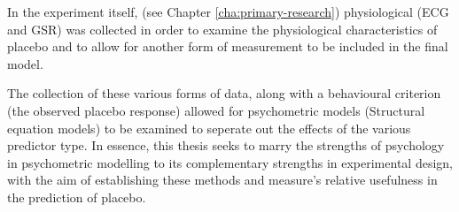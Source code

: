 In the experiment itself, (see Chapter \ref{cha:primary-research}) physiological (ECG and GSR) was collected in order to examine the physiological characteristics of placebo and to allow for another form of measurement to be included in the final model.

The collection of these various forms of data, along with a behavioural criterion (the observed placebo response) allowed for psychometric models (Structural equation models) to be examined to seperate out the effects of the various predictor type. In essence, this thesis seeks to marry the strengths of psychology in psychometric modelling to its complementary strengths in experimental design, with the aim of establishing these methods and measure's relative usefulness in the prediction of placebo. 

